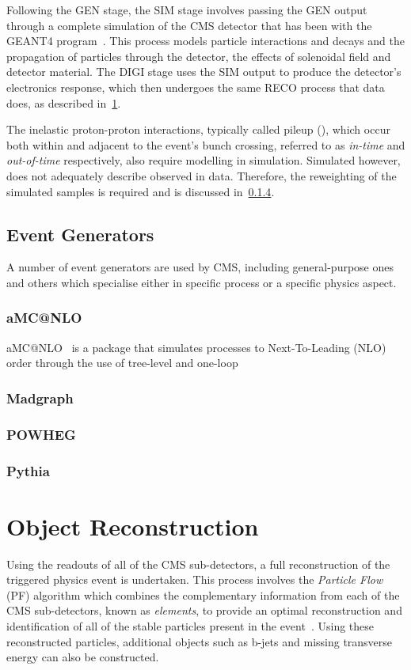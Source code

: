 Following the GEN stage, the SIM stage involves passing the GEN output through a complete simulation of the CMS detector that has been with the GEANT4 program~\cite{geant4,Lefebure:1999wja}.
This process models particle interactions and decays and the propagation of particles through the detector, the effects of solenoidal field and detector material.
The DIGI stage uses the SIM output to produce the detector's electronics response, which then undergoes the same RECO process that data does, as described in~\ref{sec:reco}.

The inelastic proton-proton interactions, typically called pileup (\PU), which occur both within and adjacent to the event's bunch crossing, referred to as \emph{in-time} and \emph{out-of-time} \PU  respectively, also require modelling in simulation.
Simulated \PU however, does not adequately describe observed \PU in data.
Therefore, the reweighting of the simulated samples is required and is discussed in~\ref{}.

\subsection{Event Generators}\label{subsec:eventGenerators}
A number of event generators are used by CMS, including general-purpose ones and others which specialise either in specific process or a specific physics aspect.

\subsubsection{aMC@NLO}
aMC@NLO~\cite{Alwall:2014hca} is a package that simulates processes to Next-To-Leading (NLO) order through the use of tree-level and one-loop
\subsubsection{Madgraph}
\subsubsection{POWHEG}
\subsubsection{Pythia}

\section{Object Reconstruction}\label{sec:reco}
Using the readouts of all of the CMS sub-detectors, a full reconstruction of the triggered physics event is undertaken.
This process involves the \emph{Particle Flow} (PF) algorithm which combines the complementary information from each of the CMS sub-detectors, known as \emph{elements}, to provide an optimal reconstruction and identification of all of the stable particles present in the event~\cite{CMS:2009nxa,CMS:2010eua,CMS-PRF-14-001}.
Using these reconstructed particles, additional objects such as b-jets and missing transverse energy can also be constructed.

